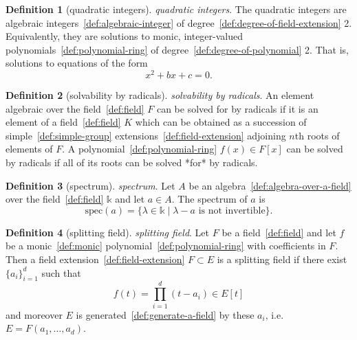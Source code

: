\documentclass[12pt,a4paper]{article}
\theoremstyle{definition}
\newtheorem{definition}{Definition}
\begin{document}
\begin{definition}[quadratic integers]\label{def:quadratic-integers}
\emph{quadratic integers}. The quadratic integers are algebraic integers~\ref{def:algebraic-integer} of degree~\ref{def:degree-of-field-extension} 2. Equivalently, they are solutions to monic, integer-valued polynomials~\ref{def:polynomial-ring} of degree~\ref{def:degree-of-polynomial} 2. That is, solutions to equations of the form $$x^2+bx+c=0.$$
\end{definition}

\begin{definition}[solvability by radicals]\label{def:solvability-by-radicals}
\emph{solvability by radicals}. An element algebraic over the field~\ref{def:field} $F$ can be solved for by radicals if it is an element of a field~\ref{def:field} $K$ which can be obtained as a succession of simple~\ref{def:simple-group} extensions~\ref{def:field-extension} adjoining $n$th roots of elements of $F$. A polynomial~\ref{def:polynomial-ring} $f(x) \in F[x]$ can be solved by radicals if all of its roots can be solved *for* by radicals.
\end{definition}

\begin{definition}[spectrum]\label{def:spectrum}
\emph{spectrum}. Let $A$ be an algebra~\ref{def:algebra-over-a-field} over the field~\ref{def:field} $\mathbb k$ and let $a\in A$. The spectrum of $a$ is $$\text{spec}(a)= \{\lambda\in\mathbb k\mid \lambda - a \text{ is not invertible}\}.$$
\end{definition}

\begin{definition}[splitting field]\label{def:splitting-field}
\emph{splitting field}. Let $F$ be a field~\ref{def:field} and let $f$ be a monic~\ref{def:monic} polynomial~\ref{def:polynomial-ring} with coefficients in $F$. Then a field extension~\ref{def:field-extension} $F\subset E$ is a splitting field if there exist $\{a_i\}_{i=1}^d$ such that $$f(t) = \prod_{i=1}^d (t-a_i) \in E[t]$$ and moreover $E$ is generated~\ref{def:generate-a-field} by these $a_i$, i.e. $E= F(a_1,\dots, a_d)$.
\end{definition}
\end{document}
